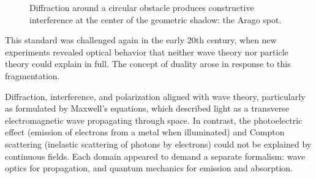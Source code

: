 \begin{figure}[h]
\centering
{}
\caption{Diffraction around a circular obstacle produces constructive interference at the center of the geometric shadow: the Arago spot.}
\end{figure}

This standard was challenged again in the early 20th century, when new experiments revealed optical behavior that neither wave theory nor particle theory could explain in full. The concept of duality arose in response to this fragmentation.

Diffraction, interference, and polarization aligned with wave theory, particularly as formulated by Maxwell's equations, which described light as a transverse electromagnetic wave propagating through space. In contrast, the photoelectric effect (emission of electrons from a metal when illuminated) and Compton scattering (inelastic scattering of photons by electrons) could not be explained by continuous fields. Each domain appeared to demand a separate formalism: wave optics for propagation, and quantum mechanics for emission and absorption.

